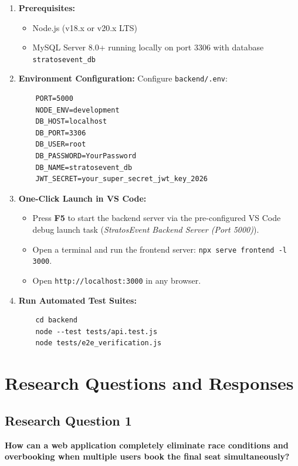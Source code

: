 \documentclass[11pt,a4paper]{article}
\begin{document}
\begin{enumerate}[leftmargin=*]
    \item \textbf{Prerequisites:}
    \begin{itemize}
        \item Node.js (v18.x or v20.x LTS)
        \item MySQL Server 8.0+ running locally on port 3306 with database \texttt{stratosevent\_db}
    \end{itemize}
    \item \textbf{Environment Configuration:} Configure \texttt{backend/.env}:
    \begin{verbatim}
    PORT=5000
    NODE_ENV=development
    DB_HOST=localhost
    DB_PORT=3306
    DB_USER=root
    DB_PASSWORD=YourPassword
    DB_NAME=stratosevent_db
    JWT_SECRET=your_super_secret_jwt_key_2026
    \end{verbatim}
    \item \textbf{One-Click Launch in VS Code:}
    \begin{itemize}
        \item Press \textbf{F5} to start the backend server via the pre-configured VS Code debug launch task (\textit{StratosEvent Backend Server (Port 5000)}).
        \item Open a terminal and run the frontend server: \texttt{npx serve frontend -l 3000}.
        \item Open \texttt{http://localhost:3000} in any browser.
    \end{itemize}
    \item \textbf{Run Automated Test Suites:}
    \begin{verbatim}
    cd backend
    node --test tests/api.test.js
    node tests/e2e_verification.js
    \end{verbatim}
\end{enumerate}

\newpage
\section*{{\color{TitleBlue}\bfseries
\fontsize{18}{22}\selectfont Research Questions and Responses}}

\subsection*{Research Question 1}
\textbf{How can a web application completely eliminate race conditions and overbooking when multiple users book the final seat simultaneously?}
\end{document}
